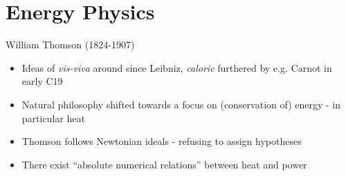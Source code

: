 \documentclass{beamer}
\newcommand{\customfootnotetext}[2]{{
\renewcommand{\thefootnote}{#1}
\footnotetext[0]{#2}}}
\begin{document}
\section{Energy Physics}%
\begin{frame}{William Thomson (1824-1907)}
	\begin{itemize}
		\item Ideas of \emph{vis-viva} around since Leibniz, \emph{caloric} furthered by e.g. Carnot in early C19
		\item Natural philosophy shifted towards a focus on (conservation of) energy - in particular heat{ \autocite{newchart}}
		\item Thomson follows Newtonian ideals - refusing to assign hypotheses
		\item There exist ``absolute numerical relations'' between heat and power{\only \autocite{thomdynam}}
	\end{itemize}
\end{frame}
\end{document}
